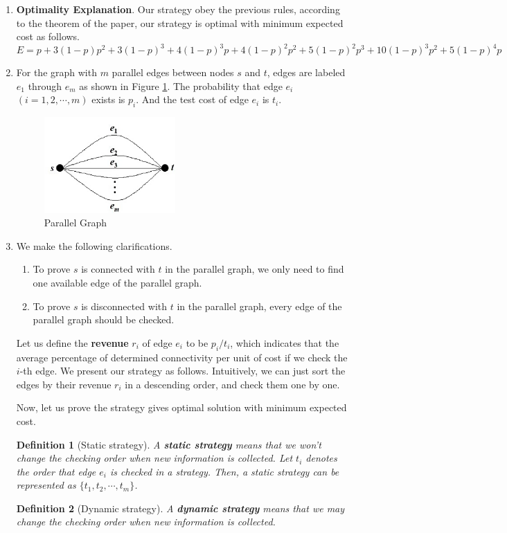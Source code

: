 \documentclass{oxmathproblems}
\makeatletter
\newtheorem{definition}{Definition}
\theoremstyle{definition}
\renewenvironment{solution}[1][Solution] {\par\pushQED{\qed}\normalfont\topsep6\p@\@plus6\p@\relax\trivlist\item[\hskip\labelsep\bfseries#1\@addpunct{.}]\ignorespaces}{\popQED\endtrivlist\@endpefalse} \makeatother
\makeatother
\begin{document}
\begin{enumerate}
\begin{solution}
	\textbf{Optimality Explanation}. Our strategy obey the previous rules, according to the theorem of the paper, our strategy is optimal with minimum expected cost as follows.
	$$
	E = p + 3(1-p)p^2 + 3(1-p)^3 + 4(1-p)^3p + 4(1-p)^2p^2 + 5(1-p)^2p^3 + 10(1-p)^3p^2  + 5(1-p)^4p
	$$
\end{solution}
\clearpage
\item For the graph with $m$ parallel edges between nodes $s$ and $t$, edges are labeled $e_1$ through $e_m$ as shown in Figure \ref{fig3}. The probability that edge $e_i$ $(i=1,2,\cdots,m)$ exists is $p_i$. And the test cost of edge $e_i$ is $t_i$. 
\begin{figure}[htbp]
	\centering
	\includegraphics[width=5cm]{2.png}
	\caption{Parallel Graph}
	\label{fig3}
\end{figure}
\begin{solution}
	We make the following clarifications.
	\vspace{-0.2cm}
	\begin{enumerate}
		\item To prove $s$ is connected with $t$ in the parallel graph, we only need to find one available edge of the parallel graph.
		\item To prove $s$ is disconnected with $t$ in the parallel graph, every edge of the parallel graph should be checked.
	\end{enumerate}
	Let us define the \textbf{revenue} $r_i$ of edge $e_i$ to be $p_i / t_i$, which indicates that the average percentage of determined connectivity per unit of cost if we check the $i$-th edge. We present our strategy as follows. {\color{blue} Intuitively, we can just sort the edges by their revenue $r_i$ in a descending order, and check them one by one.} 
	
	Now, let us prove the strategy gives optimal solution with minimum expected cost.
	\begin{definition}[Static strategy]\label{def1} A \textbf{static strategy} means that we won't change the checking order when new information is collected. Let $t_i$ denotes the order that edge $e_i$ is checked in a strategy. Then, a static strategy can be represented as $\{t_1, t_2, \cdots, t_m\}$.
	\end{definition}
	\begin{definition}[Dynamic strategy]\label{def2} A \textbf{dynamic strategy} means that we may change the checking order when new information is collected.
	\end{definition}


\end{solution}
\end{enumerate}
\end{document}
